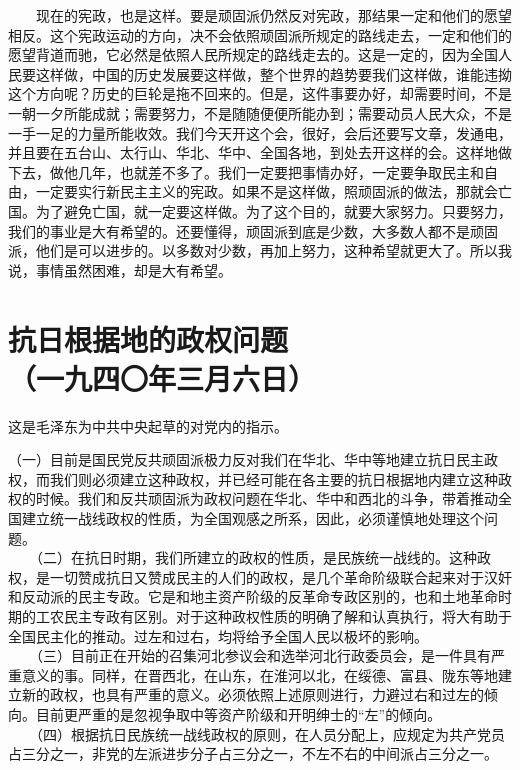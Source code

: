 \documentclass[cn,11pt,chinese]{elegantbook}
\def\myformat#1{\hfil\hfil #1}
\begin{document}
　　现在的宪政，也是这样。要是顽固派仍然反对宪政，那结果一定和他们的愿望相反。这个宪政运动的方向，决不会依照顽固派所规定的路线走去，一定和他们的愿望背道而驰，它必然是依照人民所规定的路线走去的。这是一定的，因为全国人民要这样做，中国的历史发展要这样做，整个世界的趋势要我们这样做，谁能违拗这个方向呢？历史的巨轮是拖不回来的。但是，这件事要办好，却需要时间，不是一朝一夕所能成就；需要努力，不是随随便便所能办到；需要动员人民大众，不是一手一足的力量所能收效。我们今天开这个会，很好，会后还要写文章，发通电，并且要在五台山、太行山、华北、华中、全国各地，到处去开这样的会。这样地做下去，做他几年，也就差不多了。我们一定要把事情办好，一定要争取民主和自由，一定要实行新民主主义的宪政。如果不是这样做，照顽固派的做法，那就会亡国。为了避免亡国，就一定要这样做。为了这个目的，就要大家努力。只要努力，我们的事业是大有希望的。还要懂得，顽固派到底是少数，大多数人都不是顽固派，他们是可以进步的。以多数对少数，再加上努力，这种希望就更大了。所以我说，事情虽然困难，却是大有希望。\\
\newpage\section*{\myformat{抗日根据地的政权问题}\\\myformat{（一九四〇年三月六日）}}
\begin{introduction}\item  这是毛泽东为中共中央起草的对党内的指示。\end{introduction}
（一）目前是国民党反共顽固派极力反对我们在华北、华中等地建立抗日民主政权，而我们则必须建立这种政权，并已经可能在各主要的抗日根据地内建立这种政权的时候。我们和反共顽固派为政权问题在华北、华中和西北的斗争，带着推动全国建立统一战线政权的性质，为全国观感之所系，因此，必须谨慎地处理这个问题。\\
　　（二）在抗日时期，我们所建立的政权的性质，是民族统一战线的。这种政权，是一切赞成抗日又赞成民主的人们的政权，是几个革命阶级联合起来对于汉奸和反动派的民主专政。它是和地主资产阶级的反革命专政区别的，也和土地革命时期的工农民主专政有区别。对于这种政权性质的明确了解和认真执行，将大有助于全国民主化的推动。过左和过右，均将给予全国人民以极坏的影响。\\
　　（三）目前正在开始的召集河北参议会和选举河北行政委员会，是一件具有严重意义的事。同样，在晋西北，在山东，在淮河以北，在绥德、富县、陇东等地建立新的政权，也具有严重的意义。必须依照上述原则进行，力避过右和过左的倾向。目前更严重的是忽视争取中等资产阶级和开明绅士的“左”的倾向。\\
　　（四）根据抗日民族统一战线政权的原则，在人员分配上，应规定为共产党员占三分之一，非党的左派进步分子占三分之一，不左不右的中间派占三分之一。\\
\end{document}
